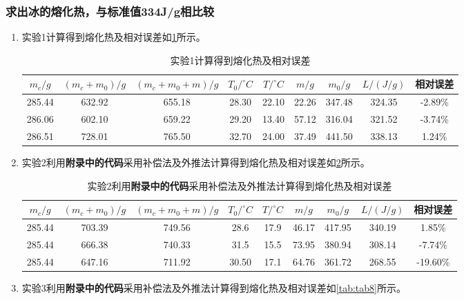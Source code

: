 \documentclass[dvipsnames, svgnames,a4paper,11pt]{article}
\begin{document}
	\subsubsection{求出冰的熔化热，与标准值334J/g相比较}
	\begin{enumerate}
		\item 实验1计算得到熔化热及相对误差如\cref{tab:tab6}所示。
		
		\begin{table}[h]
			\centering
			\begin{tabular}{|c|c|c|c|c|c|c|c|c|}
				\hline
				$m_c/g$ & $(m_c+m_0)/g$ & $(m_c+m_0+m)/g$ & $T_0/^\circ C$ & $T/^\circ C$ & $m/g$ & $m_0/g$ & $L/(J/g)$ & 相对误差 \\
				\hline
				285.44 & 632.92 & 655.18 & 28.30 & 22.10 & 22.26 & 347.48 & 324.35 & -2.89\% \\
				286.06 & 602.10 & 659.22 & 29.20 & 13.40 & 57.12 & 316.04 & 321.52 & -3.74\% \\
				286.51 & 728.01 & 765.50 & 32.70 & 24.00 & 37.49 & 441.50 & 338.13 & 1.24\% \\
				\hline
			\end{tabular}
			\caption{实验1计算得到熔化热及相对误差}
			\label{tab:tab6}
		\end{table}		
		
		\item 实验2利用\textbf{附录中的代码}采用补偿法及外推法计算得到熔化热及相对误差如\cref{tab:tab7}所示。
		
		\begin{table}[h]
			\centering
			\begin{tabular}{|c|c|c|c|c|c|c|c|c|}
				\hline
				$m_c/g$ & $(m_c+m_0)/g$ & $(m_c+m_0+m)/g$ & $T_0/^\circ C$ & $T/^\circ C$ & $m/g$ & $m_0/g$ & $L/(J/g)$ & 相对误差 \\
				\hline
				285.44 & 703.39 & 749.56 & 28.6 & 17.9 & 46.17 & 417.95 & 340.19 & 1.85\% \\
				285.44 & 666.38 & 740.33 & 31.5 & 15.5 & 73.95 & 380.94 & 308.14 & -7.74\% \\
				285.44 & 647.16 & 711.92 & 30.50 & 17.1 & 64.76 & 361.72 & 268.55 & -19.60\% \\
				\hline
			\end{tabular}
			\caption{实验2利用\textbf{附录中的代码}采用补偿法及外推法计算得到熔化热及相对误差}
			\label{tab:tab7}
		\end{table}
		
		\item 实验3利用\textbf{附录中的代码}采用补偿法及外推法计算得到熔化热及相对误差如\cref{tab:tab8}所示。
		

\end{enumerate}
\end{document}
